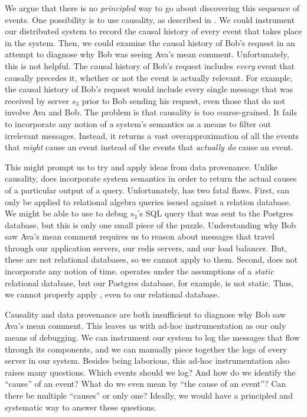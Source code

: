 We argue that there is no \emph{principled} way to go about discovering this
sequence of events. One possibility is to use causality, as described in
. We could instrument our distributed system to record the
causal history of every event that takes place in the system. Then, we could
examine the causal history of Bob's request in an attempt to diagnose why Bob
was seeing Ava's mean comment. Unfortunately, this is not helpful. The causal
history of Bob's request includes \emph{every} event that causally precedes it,
whether or not the event is actually relevant. For example, the causal history
of Bob's request would include every single message that was received by server
$s_3$ prior to Bob sending his request, even those that do not involve Ava and
Bob. The problem is that causality is too coarse-grained. It fails to
incorporate any notion of a system's semantics as a means to filter out
irrelevant messages.  Instead, it returns a vast overapproximation of all the
events that \emph{might} cause an event instead of the events that
\emph{actually do} cause an event.

This might prompt us to try and apply ideas from data provenance. Unlike
causality, \whyprovenance{} does incorporate system semantics in order to
return the actual causes of a particular output of a query. Unfortunately,
\whyprovenance{} has two fatal flaws. First, \whyprovenance{} can only be
applied to relational algebra queries issued against a relation database. We
might be able to use \whyprovenance{} to debug $s_3$'s SQL query that was sent
to the Postgres database, but this is only one small piece of the puzzle.
Understanding why Bob saw Ava's mean comment requires us to reason about
messages that travel through our application servers, our redis servers, and
our load balancer. But, these are not relational databases, so we cannot apply
\whyprovenance{} to them. Second, \whyprovenance{} does not incorporate any
notion of time. \Whyprovenance{} operates under the assumptions of a
\emph{static} relational database, but our Postgres database, for example, is
not static. Thus, we cannot properly apply \whyprovenance{}, even to our
relational database.

Causality and data provenance are both insufficient to diagnose why Bob saw
Ava's mean comment. This leaves us with ad-hoc instrumentation as our only
means of debugging. We can instrument our system to log the messages that flow
through its components, and we can manually piece together the logs of every
server in our system. Besides being laborious, this ad-hoc instrumentation also
raises many questions. Which events should we log? And how do we identify the
``cause'' of an event? What do we even mean by ``the cause of an event''? Can
there be multiple ``causes'' or only one? Ideally, we would have a principled
and systematic way to answer these questions.

